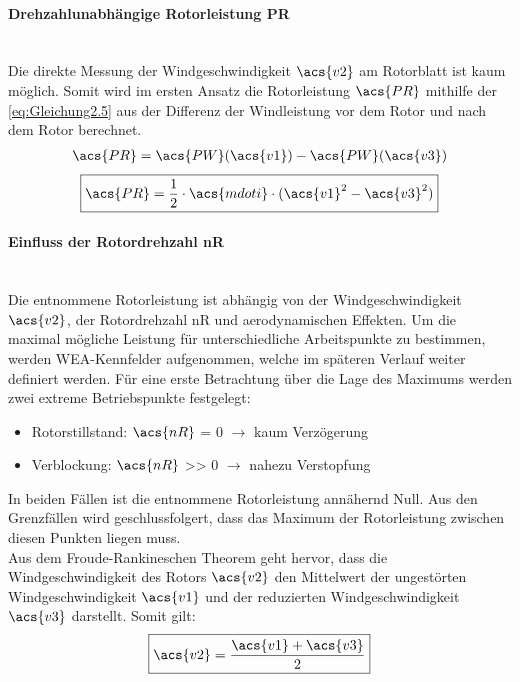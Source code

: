 \paragraph{Drehzahlunabhängige Rotorleistung \acs{PR}}\mbox{}\smallskip\\
Die direkte Messung der Windgeschwindigkeit $\acs{v2}$ am Rotorblatt ist kaum möglich. Somit wird im ersten Ansatz die Rotorleistung $\acs{PR}$ mithilfe der \autoref{eq:Gleichung2.5} aus der Differenz der Windleistung vor dem Rotor und nach dem Rotor berechnet.
\begin{align*} \label{eq:Gleichung2.8}
    \acs{PR} = \acs{PW}(\acs{v1}) - \acs{PW}(\acs{v3})
\end{align*}
\begin{equation}\label{eq:Gleichung2.8}
    \boxed{\acs{PR} = \frac{1}{2} \cdot \acs{mdoti} \cdot (\acs{v1}^2 - \acs{v3}^2)}
\end{equation}

\paragraph{Einfluss der Rotordrehzahl \acs{nR}}\mbox{}\smallskip\\
Die entnommene Rotorleistung ist abhängig von der Windgeschwindigkeit $\acs{v2}$, der Rotordrehzahl \acs{nR} und aerodynamischen Effekten. Um die maximal mögliche Leistung für unterschiedliche Arbeitspunkte zu bestimmen, werden WEA-Kennfelder aufgenommen, welche im späteren Verlauf weiter definiert werden. Für eine erste Betrachtung über die Lage des Maximums werden zwei extreme Betriebspunkte festgelegt:
\begin{itemize}
    \item Rotorstillstand: $\acs{nR}$ = 0 $\rightarrow$ kaum Verzögerung
    \item Verblockung: $\acs{nR}$ >> 0 $\rightarrow$ nahezu Verstopfung
\end{itemize}

In beiden Fällen ist die entnommene Rotorleistung annähernd Null. Aus den Grenzfällen wird geschlussfolgert, dass das Maximum der Rotorleistung zwischen diesen Punkten liegen muss.\\
Aus dem Froude-Rankineschen Theorem geht hervor, dass die Windgeschwindigkeit des Rotors $\acs{v2}$ den Mittelwert der ungestörten Windgeschwindigkeit $\acs{v1}$ und der reduzierten Windgeschwindigkeit $\acs{v3}$ darstellt. Somit gilt:
\begin{equation}\label{eq:Gleichung2.9}
    \boxed{\acs{v2} = \frac{\acs{v1} + \acs{v3}}{2}}
\end{equation}

